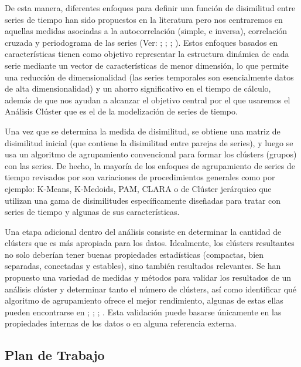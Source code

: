 \documentclass[10pt,a4paper]{article}
\begin{document}
De esta manera, diferentes enfoques para definir una función de disimilitud entre series de tiempo han sido propuestos en la literatura pero nos centraremos en aquellas medidas asociadas a la autocorrelación (simple, e inversa), correlación cruzada y periodograma de las series (Ver: \cite{struzik1999haar};  \cite{galeano2000multivariate}; \cite{caiado2006periodogram}; \cite{chouakria2007adaptive}). Estos enfoques basados en características tienen como objetivo representar la estructura dinámica de cada serie mediante un vector de características de menor dimensión, lo que permite una reducción de dimensionalidad (las series temporales son esencialmente datos de alta dimensionalidad) y un ahorro significativo en el tiempo de cálculo, además de que nos ayudan a alcanzar el objetivo central por el que usaremos el Análisis Clúster que es el de la modelización de series de tiempo.

Una vez que se determina la medida de disimilitud, se obtiene una matriz de disimilitud inicial (que contiene la disimilitud entre parejas de series), y luego se usa un algoritmo de agrupamiento convencional para formar los clústers (grupos) con las series. De hecho, la mayoría de los enfoques de agrupamiento de series de tiempo revisados por \cite{liao2005clustering} son variaciones de procedimientos generales como por ejemplo: K-Means, K-Medoids, PAM, CLARA \cite{kaufman1986clustering} o de Clúster jerárquico que utilizan una gama de disimilitudes específicamente diseñadas para tratar con series de tiempo y algunas de sus características. 

Una etapa adicional dentro del análisis consiste en determinar la cantidad de clústers que es más apropiada para los datos. Idealmente, los clústers resultantes no solo deberían tener buenas propiedades estadísticas (compactas, bien separadas, conectadas y estables), sino también resultados relevantes. Se han propuesto una variedad de medidas y métodos para validar los resultados de un análisis clúster y determinar tanto el número de clústers, así como identificar qué algoritmo de agrupamiento ofrece el mejor rendimiento, algunas de estas ellas pueden encontrarse en \cite{fraley1998many}; \cite{duda2001pattern} ; \cite{salvador2004determining} ; \cite{kerr2001bootstrapping}. Esta validación puede basarse únicamente en las propiedades internas de los datos o en alguna referencia externa.



\newpage

\subsection{Plan de Trabajo}
\end{document}

